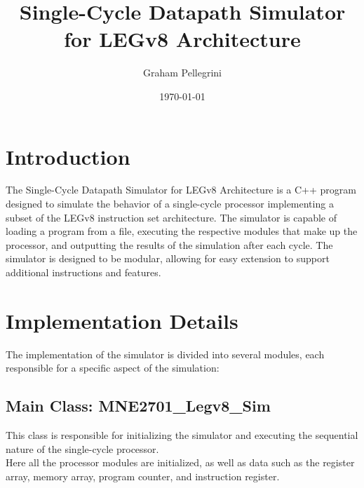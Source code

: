 \documentclass{article}
\title{Single-Cycle Datapath Simulator for LEGv8 Architecture}
\author{Graham Pellegrini}
\date{\today}
\begin{document}
\maketitle

\tableofcontents

\newpage

\section{Introduction}
The Single-Cycle Datapath Simulator for LEGv8 Architecture is a C++ program designed to simulate the behavior of a single-cycle processor implementing a subset of the LEGv8 instruction set architecture. The simulator is capable of loading a program from a file, executing the respective modules that make up the processor, and outputting the results of the simulation after each cycle. The simulator is designed to be modular, allowing for easy extension to support additional instructions and features.

\section{Implementation Details}

The implementation of the simulator is divided into several modules, each responsible for a specific aspect of the simulation:

\subsection{Main Class: MNE2701\_Legv8\_Sim}
This class is responsible for initializing the simulator and executing the sequential nature of the single-cycle processor.\\

Here all the processor modules are initialized, as well as data such as the register array, memory array, program counter, and instruction register.\\
\end{document}
